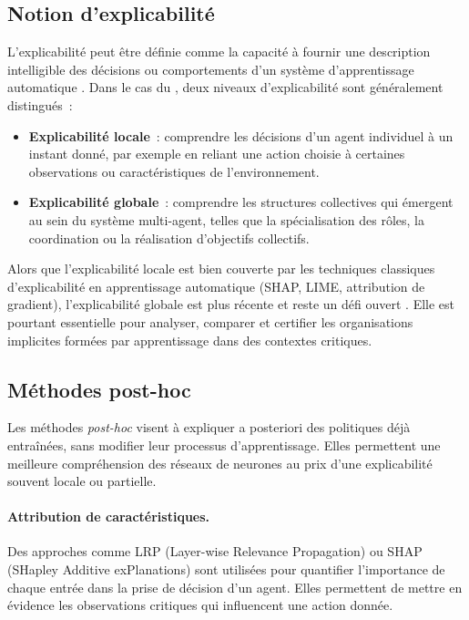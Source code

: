 \subsection{Notion d’explicabilité}

\noindent
L’explicabilité peut être définie comme la capacité à fournir une description intelligible
des décisions ou comportements d’un système d’apprentissage automatique \cite{doshivelez2017rigorous}.
Dans le cas du , deux niveaux d’explicabilité sont généralement distingués~:
\begin{itemize}
  \item \textbf{Explicabilité locale}~: comprendre les décisions d’un agent individuel
        à un instant donné, par exemple en reliant une action choisie
        à certaines observations ou caractéristiques de l’environnement.
  \item \textbf{Explicabilité globale}~: comprendre les structures collectives
        qui émergent au sein du système multi-agent, telles que la spécialisation
        des rôles, la coordination ou la réalisation d’objectifs collectifs.
\end{itemize}

Alors que l’explicabilité locale est bien couverte par les techniques classiques
d’explicabilité en apprentissage automatique (SHAP, LIME, attribution de gradient),
l’explicabilité globale est plus récente et reste un défi ouvert
\cite{poupart2025perspectives, milani2022maviper}.
Elle est pourtant essentielle pour analyser, comparer et certifier
les organisations implicites formées par apprentissage dans des contextes critiques.

\subsection{Méthodes post-hoc}

\noindent
Les méthodes \textit{post-hoc} visent à expliquer a posteriori des politiques déjà entraînées,
sans modifier leur processus d’apprentissage.
Elles permettent une meilleure compréhension des réseaux de neurones
au prix d’une explicabilité souvent locale ou partielle.

\paragraph{Attribution de caractéristiques.}
Des approches comme LRP (Layer-wise Relevance Propagation) \cite{bach2015lrp}
ou SHAP (SHapley Additive exPlanations) \cite{lundberg2017unified}
sont utilisées pour quantifier l’importance de chaque entrée
dans la prise de décision d’un agent.
Elles permettent de mettre en évidence les observations critiques
qui influencent une action donnée.

